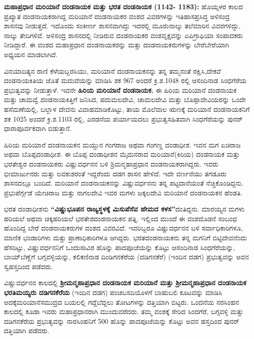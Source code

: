 \textbf{ಮಹಾಪ್ರಧಾನ ಮರಿಯಾನೆ ದಂಡನಾಯಕ ಮತ್ತು ಭರತ ದಂಡನಾಯಕ (1142- 1183):} ಹೊಯ್ಸಳರ ಕಾಲದ ಪ್ರಖ್ಯಾತ ದಂಡನಾಯಕರಾಗಿದ್ದ ಮರಿಯಾನೆ ದಂಡನಾಯಕರ ವಂಶದ ವಿವರಗಳನ್ನು ಇತಿಹಾಸಪ್ರಸಿದ್ಧ ಅಳಿಸಂದ್ರ ಶಾಸನವು ನೀಡುತ್ತದೆ. ಇದೊಂದು ಸಂಕೀರ್ಣ ಶಾಸನವಾಗಿದ್ದು ಇದರಲ್ಲಿ ಮೂರು\enginline{-}ನಾಲ್ಕು ತಲೆಮಾರಿನ ವಿವರಗಳಿದ್ದು, ನಾಲ್ಕು ತೇದಿಗಳಿವೆ. ಅಳಿಸಂದ್ರ ಶಾಸನದಲ್ಲಿ ನೀಡಿರುವ ದಂಡನಾಯಕರ ವಂಶವೃಕ್ಷವನ್ನು ಎಪಿಗ್ರಾಫಿಯಾ ಸಂಪಾದಕರು ನೀಡಿದ್ದಾರೆ. ಈ ವಂಶದ ಮಹಾಪ್ರಧಾನ ದಂಡನಾಯಕರನ್ನು ಮತ್ತು ದಂಡನಾಯಕರುಗಳನ್ನು ಬೇರೆಬೇರೆಯಾಗಿ ಅಧ್ಯಯನ ಮಾಡಲಾಗಿದೆ.

ವಿನಯಾದಿತ್ಯನ ರಾಣಿ ಕೆಳೆಯಬ್ಬರಸಿಯು, ಮರಿಯಾನೆ ದಂಡನಾಯಕನನ್ನು ತನ್ನ ತಮ್ಮನಂತೆ ರಕ್ಷಿಸಿ,\break ದೇಕವೆ ದಂಡನಾಯಕಿತಿಯ ಜೊತೆ ಮದುವೆಯನ್ನು ಮಾಡಿಸಿ ಶಕ 967 ಅಂದರೆ ಕ್ರಿ.ಶ.1048 ರಲ್ಲಿ ಆಸಂದಿನಾಡ ಸಿಂಧಗೆರೆಯ ಪ್ರಭುತ್ವವನ್ನು ನೀಡುತ್ತಾಳೆ. ಇವನೇ \textbf{ಹಿರಿಯ ಮರಿಯಾನೆ ದಂಡನಾಯಕ. }ಈ ಹಿರಿಯ ಮರಿಯಾನೆ ದಂಡನಾಯಕ ಮತ್ತು ಚಾಮವ್ವೆ ದಂಡನಾಯಕಿತ್ತಿಗೆ ಜನಿಸಿದ, ಪದುಮಲದೇವಿ, ಚಾಮಲದೇವಿ ಮತ್ತು ಬೊಪ್ಪಾದೇವಿಯರನ್ನು ಒಂದೇ ಹಸೆಮಣೆಯಲ್ಲಿ, ಬಲ್ಲಾಳ ದೇವನು ವಿವಾಹಮಾಡಿಕೊಟ್ಟು, ತಾಯ ಮೊಲೆವಾಲ ಋಣಕ್ಕೆ ಮರಿಯಾನೆ ದಂಡನಾಯಕನಿಗೆ ಶಕ 1025 ಅಂದರೆ ಕ್ರಿ.ಶ.1103 ರಲ್ಲಿ, ಎರಡನೆಯ ಪರ್ಯಾಯದಲು ಪ್ರಭುತ್ವಸಹಿತವಾಗಿ ಸಿಂಧಗೆರೆಯನ್ನು ಪುನರ್​ ಧಾರಾಪೂರ್ವಕವಾಗಿ ಬಿಡುತ್ತಾನೆ.

ಹಿರಿಯ ಮರಿಯಾನೆ ದಂಡನಾಯಕನ ಮಯ್ದುನ ಗಂಗರಾಜ ಅಥವಾ ಗಂಗಣ್ಣ ದಂಡಾಧೀಶ. ಇವನ ಮಗ ಏಚಿರಾಜ ಅಥವಾ ಬೊಪ್ಪದಂಡಾಧೀಶ. ಈ ಬೊಪ್ಪ ದಂಡಾಧೀಶನ ಮೈದುನರಾದ ಮರಿಯಾನೆ(ಕಿರಿಯ) ದಂಡನಾಯಕ ಮತ್ತು ಭರತೇಶ್ವರ ದಂಡನಾಯಕರು ವಿಷ್ಣುವರ್ಧನನ ಬಳಿ ಶ್ರಿಮನ್ಮಹಾಪ್ರಧಾನ ದಂಡನಾಯಕರಾಗಿದ್ದರು. ಇವರು ಭೀಮಾರ್ಜುನರು ಮತ್ತು ಲವಕುಶರಂತೆ ಇದ್ದರೆಂದು ದಡಗ ಶಾಸನ ಹೇಳಿದೆ. ಇದೇ ವರ್ಣನೆಯು ತಗಡೂರು ಶಾಸನದಲ್ಲೂ ಬಂದಿದೆ. ಮರಿಯಾನೆ ದಂಡನಾಯಕನನ್ನು ವಿಷ್ಣುವರ್ಧನನು ತನ್ನ ಪಟ್ಟದಾನೆಯಂತೆ ನೆಚ್ಚಿಕೊಂಡಿದ್ದನು. ಪ್ರಭುಪೆರ್ಗ್ಗಡೆ ಯೇಚಿರಾಜ ಮತ್ತು ನಾಗಲದೇವಿ ಇವರ ಮಗಳು ಜಕ್ಕಲದೇವಿ ಮರಿಯಾನೆ ದಂಡನಾಯಕನ ಹೆಂಡತಿ.

ಭರತ ದಂಡಾಧೀಶನು \textbf{“ವಿಷ್ಣುಭೂಪನ ರಾಜ್ಯಸ್ಥಳಕ್ಕೆ ಮಿಸುಪೆಸೆವ ಹೇಮದ ಕಳಸ”}ದಂತಿದ್ದನು. ಮಾರಯ್ಯನ ಮಗಳು ಹರಿಯಲೆ ಅಥವಾ ಚಿಕ್ಕಹರಿಯಲೆ ಭರತೇಶದಂಡನಾಯಕನ ಪತ್ನಿ. ಇಲ್ಲಿಂದ ಮುಂದೆ ಈ ವಂಶದೊಡನೆ ಸಂಬಂಧ ಹೊಂದಿದ್ದ ಬೇರೆ ದಂಡನಾಯಕರುಗಳ ವಂಶದ ವಿವರವಿದೆ. ಇವರಿಬ್ಬರೂ ವಿಷ್ಣುವರ್ಧನನ ಬಳಿ ಸರ್ವಾಧಿಕಾರಿಗಳೂ, ಮಾಣಿಕ ಭಂಡಾರಿಗಳು ಮತ್ತು ಪ್ರಾಣಾಧಿಕಾರಿಗಳೂ ಆಗಿದ್ದರು. ಭರತದಂಡನಾಯಕನು ತನ್ನ ಮಗನಿಗೆ ಬಿಟ್ಟಿದೇವನೆಂದು ಹೆಸರಿಟ್ಟು, ವಿಷ್ಣುವರ್ಧನನಿಗೆ ಒಂದುಸಾವಿರ ಹೊನ್ನು ಪಾದಪೂಜೆಯನ್ನು ಕೊಟ್ಟು ಆಸಂದಿನಾಡ ಸಿಂಧಗೆರೆಯನ್ನು, ಬಾಯ್​ಬೆಣ್ಣೆಗೆ ಬಗ್ಗವಳ್ಳಿಯನ್ನು, ಕಲಿಕಣಿನಾಡ ದಿಂಡಿಗನಕೆರೆಯ (ದಡಿಗನಕೆರೆ) (ಇಂದಿನ ದಡಗ) ಪ್ರಭುತ್ವವನ್ನು ಅವನ ಸ್ವಹಸ್ತದಿಂದ ಪಡೆದರು.

ವಿಷ್ಣುವರ್ಧನನ ಕಾಲದಲ್ಲಿ \textbf{ಶ‍್ರೀಮನ್ಮಹಾಪ್ರಧಾನ ದಂಡನಾಯಕ ಮರಿಯಾನೆ ಮತ್ತು ಶ‍್ರೀಮನ್ಮಹಾಪ್ರಧಾನ ದಂಡನಾಯಕ ಭರತಿಮಯ್ಯರು ದಡಿಗನಕೆರೆಯ} (ಇಂದಿನ ದಡಗ) ಪಂಚಬಸದಿಯೊಳಗೆ ಬಾಹುಬಲಿ ಕೂಟವನ್ನು ಮಾಡಿಸಿ ಅದಕ್ಕೆ\break ಮರಿಯಾನೆಸಮುದ್ರದ ಬಯಲಲ್ಲಿ ಗದ್ದೆಬೆದ್ದಲು ತೋಟಗಳನ್ನು ದತ್ತಿಯಾಗಿ ಬಿಟ್ಟರು. ಒಂದನೆಯ ನರಸಿಂಹನ ಕಾಲದಲ್ಲಿ ಕೂಡಾ ಇವರು ಮಹಾಪ್ರಧಾನರಾಗಿ ಮುಂದುವರೆದರು. ತಮ್ಮ ವಂಶಕ್ಕೆ ಸೇರಿದ ಸಿಂದಗೆರೆ, ಬಗ್ಗವಳ್ಳಿ ಮತ್ತು ದಡಿಗನಕೆರೆಯ ಪ್ರಭುತ್ವವನ್ನು ನಾರಸಿಂಹನಿಗೆ 500 ಹೊನ್ನು ಪಾದಪೂಜೆಯನ್ನು ಕೊಟ್ಟು ಅವನ ಹಸ್ತದಿಂದ ಪುನರ್​ದತ್ತಿಯಾಗಿ ಪಡೆದರು.

